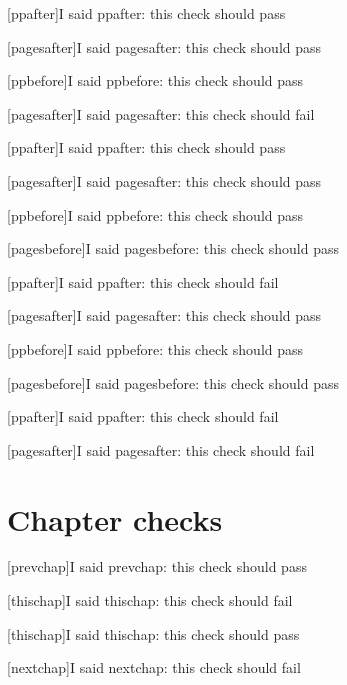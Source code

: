 \documentclass{book}
\begin{document}
[ppafter]{I said ppafter: this check should pass}

[pagesafter]{I said pagesafter: this check should pass}

\clearpage{}


[ppbefore]{I said ppbefore: this check should pass}

[pagesafter]{I said pagesafter: this check should fail}

[ppafter]{I said ppafter: this check should pass}

[pagesafter]{I said pagesafter: this check should pass}

\clearpage{}


[ppbefore]{I said ppbefore: this check should pass}

[pagesbefore]{I said pagesbefore: this check should pass}

[ppafter]{I said ppafter: this check should fail}

[pagesafter]{I said pagesafter: this check should pass}

\clearpage{}


[ppbefore]{I said ppbefore: this check should pass}

[pagesbefore]{I said pagesbefore: this check should pass}

[ppafter]{I said ppafter: this check should fail}

[pagesafter]{I said pagesafter: this check should fail}

\chapter{Chapter checks}

[prevchap]{I said prevchap: this check should pass}

[thischap]{I said thischap: this check should fail}

[thischap]{I said thischap: this check should pass}

[nextchap]{I said nextchap: this check should fail}
\end{document}
